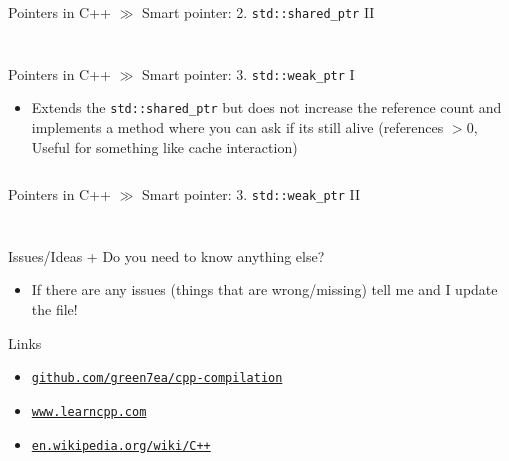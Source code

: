 \documentclass[10pt]{beamer}
\newcommand{\urlCustom}[1]{\href{https://#1}{\textcolor{greyCustom}{\texttt{#1}}}}
\begin{document}
\begin{frame}{Pointers in C++ $\gg$ Smart pointer: 2.  \texttt{std::shared_ptr} II}
\begin{itemize}
	\inputminted[bgcolor=lightGreyCustom,fontsize=\scriptsize,firstline=18]{cpp}{./resources/shared_ptr.cpp}
	\vspace{-9mm}
	\inputminted[bgcolor=lightGreyCustom,fontsize=\scriptsize ]{sh}{./resources/build_shared_ptr.sh}
\end{itemize}
\end{frame}

\begin{frame}{Pointers in C++ $\gg$ Smart pointer: 3.  \texttt{std::weak_ptr} I}
\begin{itemize}
	\item Extends the \texttt{std::shared_ptr} but does not increase the reference count and implements a method where you can ask if its still alive (references $> 0$, Useful for something like cache interaction)
	\inputminted[bgcolor=lightGreyCustom,fontsize=\scriptsize,lastline=17]{cpp}{./resources/weak_ptr.cpp}
\end{itemize}
\end{frame}

\begin{frame}{Pointers in C++ $\gg$ Smart pointer: 3.  \texttt{std::weak_ptr} II}
\begin{itemize}
	\inputminted[bgcolor=lightGreyCustom,fontsize=\scriptsize,firstline=18]{cpp}{./resources/weak_ptr.cpp}
	\vspace{-9mm}
	\inputminted[bgcolor=lightGreyCustom,fontsize=\scriptsize ]{sh}{./resources/build_weak_ptr.sh}
\end{itemize}
\end{frame}


\begin{frame}{Issues/Ideas + Do you need to know anything else?}
	\begin{itemize}
		\item If there are any issues (things that are wrong/missing) tell me and I update the file!
	\end{itemize}
\end{frame}

\begin{frame}{Links}
	\begin{itemize}
		\item\urlCustom{github.com/green7ea/cpp-compilation}
		\item\urlCustom{www.learncpp.com}
		\item\urlCustom{en.wikipedia.org/wiki/C++}
		
	\end{itemize}
	\begin{center}\doclicenseThis\end{center}
\end{frame}
\end{document}
